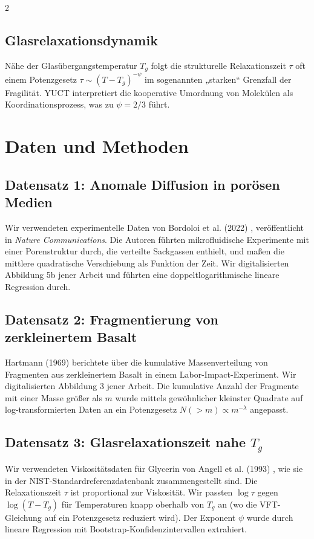 \documentclass[11pt,a4paper]{article}
\begin{document}
\begin{multicols}{2}
		\subsection{Glasrelaxationsdynamik}
		Nähe der Glasübergangstemperatur \(T_g\) folgt die strukturelle Relaxationszeit \(\tau\) oft einem Potenzgesetz \(\tau \sim (T - T_g)^{-\psi}\) im sogenannten „starken“ Grenzfall der Fragilität. YUCT interpretiert die kooperative Umordnung von Molekülen als Koordinationsprozess, was zu \(\psi = 2/3\) führt.
		
		\section{Daten und Methoden}
		
		\subsection{Datensatz 1: Anomale Diffusion in porösen Medien}
		Wir verwendeten experimentelle Daten von Bordoloi et al. (2022) \cite{Bordoloi2022}, veröffentlicht in \emph{Nature Communications}. Die Autoren führten mikrofluidische Experimente mit einer Porenstruktur durch, die verteilte Sackgassen enthielt, und maßen die mittlere quadratische Verschiebung als Funktion der Zeit. Wir digitalisierten Abbildung 5b jener Arbeit und führten eine doppeltlogarithmische lineare Regression durch.
		
		\subsection{Datensatz 2: Fragmentierung von zerkleinertem Basalt}
		Hartmann (1969) \cite{Hartmann1969} berichtete über die kumulative Massenverteilung von Fragmenten aus zerkleinertem Basalt in einem Labor-Impact-Experiment. Wir digitalisierten Abbildung 3 jener Arbeit. Die kumulative Anzahl der Fragmente mit einer Masse größer als \(m\) wurde mittels gewöhnlicher kleinster Quadrate auf log-transformierten Daten an ein Potenzgesetz \(N(>m) \propto m^{-\lambda}\) angepasst.
		
		\subsection{Datensatz 3: Glasrelaxationszeit nahe \(T_g\)}
		Wir verwendeten Viskositätsdaten für Glycerin von Angell et al. (1993) \cite{Angell1993}, wie sie in der NIST-Standardreferenzdatenbank zusammengestellt sind. Die Relaxationszeit \(\tau\) ist proportional zur Viskosität. Wir passten \(\log \tau\) gegen \(\log(T - T_g)\) für Temperaturen knapp oberhalb von \(T_g\) an (wo die VFT-Gleichung auf ein Potenzgesetz reduziert wird). Der Exponent \(\psi\) wurde durch lineare Regression mit Bootstrap-Konfidenzintervallen extrahiert.
		

\end{multicols}
\end{document}
